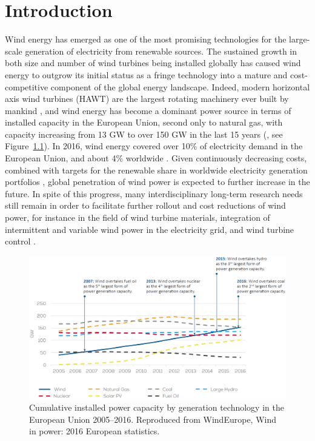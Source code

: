 \chapter{Introduction}\label{ch:introduction}

Wind energy has emerged as one of the most promising technologies for the large-scale generation of electricity from renewable sources. The sustained growth in both size and number of wind turbines being installed globally has caused wind energy to outgrow its initial status as a fringe technology into a mature and cost-competitive component of the global energy landscape. Indeed, modern horizontal axis wind turbines (HAWT) are the largest rotating machinery ever built by mankind \citep{van2016long}, and wind energy has become a dominant power source in terms of installed capacity in the European Union, second only to natural gas, with capacity increasing from 13 GW to over 150 GW in the last 15 years (\citealp{windeurope}, see Figure~\ref{fig:windeurope}). In 2016, wind energy covered over 10\% of electricity demand in the European Union, and about 4\% worldwide \citep{gwec2017}. Given continuously decreasing costs, combined with targets for the renewable share in worldwide electricity generation portfolios \citep{EC,ren21}, global penetration of wind power is expected to further increase in the future. In spite of this progress, many interdisciplinary long-term research needs still remain in order to facilitate further rollout and cost reductions of wind power, for instance in the field of wind turbine materials, integration of intermittent and variable wind power in the electricity grid, and wind turbine control \citep{wind2013long,van2016long}.

\begin{figure}
	\centering
	\includegraphics[width=\textwidth]{chapters/introduction/we3.eps}
	\caption[Cumulative installed power capacity by generation technology in the European Union 2005--2016.]{Cumulative installed power capacity by generation technology in the European Union 2005--2016. Reproduced from WindEurope, Wind in power: 2016 European statistics.  \label{fig:windeurope}}
\end{figure}

